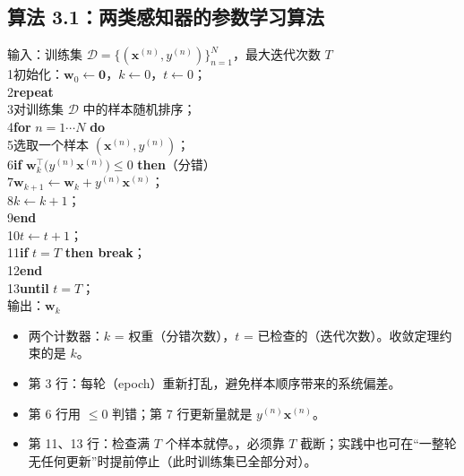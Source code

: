 \subsection{算法 3.1：两类感知器的参数学习算法}
\noindent\begin{minipage}[t]{0.5\linewidth}\vspace{0pt}
\begin{method}[算法 3.1：两类感知器的参数学习]
\small 输入：训练集 $\mathcal D=\{(\bm x^{(n)},y^{(n)})\}_{n=1}^N$，最大迭代次数 $T$\\
1\quad 初始化：$\bm w_0\leftarrow\bm 0$，$k\leftarrow0$，$t\leftarrow0$；\\
2\quad \textbf{repeat}\\
3\quad\quad 对训练集 $\mathcal D$ 中的样本随机排序；\\
4\quad\quad \textbf{for} $n=1\cdots N$ \textbf{do}\\
5\quad\quad\quad 选取一个样本 $(\bm x^{(n)},y^{(n)})$；\\
6\quad\quad\quad \textbf{if} $\bm w_k^\top\big(y^{(n)}\bm x^{(n)}\big)\le0$ \textbf{then}\quad（分错）\\
7\quad\quad\quad\quad $\bm w_{k+1}\leftarrow\bm w_k+y^{(n)}\bm x^{(n)}$；\\
8\quad\quad\quad\quad $k\leftarrow k+1$；\\
9\quad\quad\quad \textbf{end}\\
10\quad\quad $t\leftarrow t+1$；\\
11\quad\quad \textbf{if} $t=T$ \textbf{then break}；\\
12\quad\quad \textbf{end}\\
13\quad \textbf{until} $t=T$；\\
输出：$\bm w_k$
\end{method}
\end{minipage}\hfill
\begin{minipage}[t]{0.47\linewidth}\vspace{2pt}\small
\begin{itemize}
\item 两个计数器：$k$ = 权重（分错次数），$t$ = 已检查的（迭代次数）。收敛定理约束的是 $k$。
\item 第 3 行：每轮（epoch）重新打乱，避免样本顺序带来的系统偏差。
\item 第 6 行用 $\le0$ 判错；第 7 行更新量就是 $y^{(n)}\bm x^{(n)}$。
\item 第 11、13 行：检查满 $T$ 个样本就停。，必须靠 $T$ 截断；实践中也可在“一整轮无任何更新”时提前停止（此时训练集已全部分对）。
\end{itemize}
\end{minipage}

